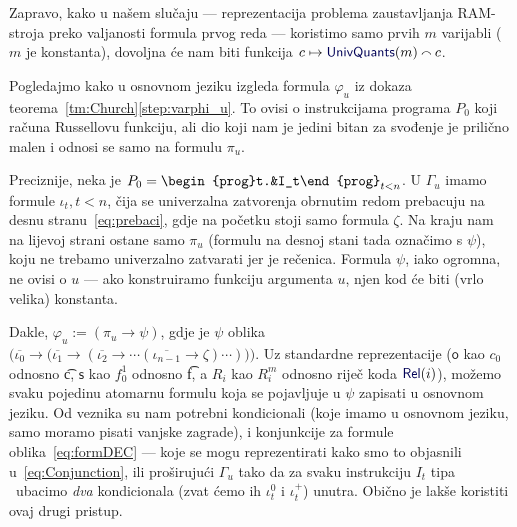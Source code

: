 Zapravo, kako u našem slučaju --- reprezentacija problema zaustavljanja RAM-stroja preko valjanosti formula prvog reda --- koristimo samo prvih $m$ varijabli ($m$ je konstanta), dovoljna će nam biti funkcija $c\mapsto\f{UnivQuants}(m)\conc{}c$.

Pogledajmo kako u osnovnom jeziku izgleda formula $\varphi_u$ iz dokaza teorema~\ref{tm:Church}\eqref{step:varphi_u}. To ovisi o instrukcijama programa $P_0$ koji računa Russellovu funkciju, ali dio koji nam je jedini bitan za svođenje je prilično malen i odnosi se samo na formulu $\pi_u$.

Preciznije, neka je $P_0=\begin{prog}t.&I_t\end{prog}_{t<n}$. U $\Gamma_u$ imamo formule $\iota_t,t<n$, čija se univerzalna zatvorenja obrnutim redom prebacuju na desnu stranu~\eqref{eq:prebaci}, gdje na početku stoji samo formula $\zeta$. Na kraju nam na lijevoj strani ostane samo $\pi_u$ (formulu na desnoj stani tada označimo s $\psi$), koju ne trebamo univerzalno zatvarati jer je rečenica. Formula $\psi$, iako ogromna, ne ovisi o $u$ --- ako konstruiramo funkciju argumenta $u$, njen kod će biti (vrlo velika) konstanta.

    Dakle, $\varphi_u:=(\pi_u\to\psi)$, gdje je $\psi$ oblika $\bigl(\overline{\iota_0}\to\bigl(\overline{\iota_1}\to(\overline{\iota_2}\to\dotsb(\overline{\iota_{n-1}}\to\zeta)\dotsm)\bigr)\bigr)$\text.
Uz standardne reprezentacije ($\mathsf o$ kao $c_0$ odnosno \t c, $\mathsf s$ kao $f_0^1$ odnosno \t f, a $R_i$ kao $R_i^m$ odnosno riječ koda $\f{Rel}(i)$), možemo svaku pojedinu atomarnu formulu koja se pojavljuje u $\psi$ zapisati u osnovnom jeziku. Od veznika su nam potrebni kondicionali (koje imamo u osnovnom jeziku, samo moramo pisati vanjske zagrade), i konjunkcije za formule oblika~\eqref{eq:formDEC} --- koje se mogu reprezentirati kako smo to objasnili u~\eqref{eq:Conjunction}, ili proširujući $\Gamma_u$ tako da za svaku instrukciju $I_t$ tipa \dec\ ubacimo \emph{dva} kondicionala (zvat ćemo ih $\iota_t^0$ i $\iota_t^+$) unutra. Obično je lakše koristiti ovaj drugi pristup.

